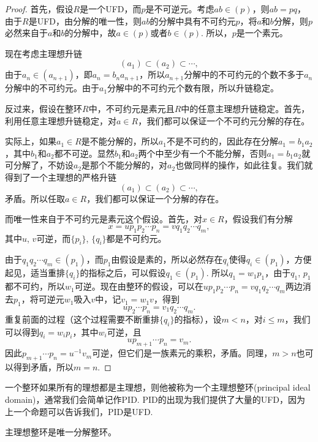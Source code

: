 \begin{proof}
首先，假设$R$是一个UFD，而$p$是不可逆元。考虑$ab\in (p)$，则$ab=pq$，由于$R$是UFD，由分解的唯一性，则$ab$的分解中具有不可约元$p$，将$a$和$b$分解，则$p$必然来自于$a$和$b$的分解中，故$a\in (p)$或者$b\in (p)$. 所以，$p$是一个素元。

现在考虑主理想升链
\[
	(a_1)\subset (a_2)\subset \cdots,
\]
由于$a_n\in (a_{n+1})$，即$a_n=b_na_{n+1}$，所以$a_{n+1}$分解中的不可约元的个数不多于$a_n$分解中的不可约元。由于$a_1$分解中的不可约元个数有限，所以升链稳定。

反过来，假设在整环$R$中，不可约元是素元且$R$中的任意主理想升链稳定。首先，利用任意主理想升链稳定，对$a\in R$，我们都可以保证一个不可约元分解的存在。

实际上，如果$a_1\in R$是不能分解的，所以$a_1$不是不可约的，因此存在分解$a_1=b_1a_2$，其中$b_1$和$a_2$都不可逆。显然$b_1$和$a_2$两个中至少有一个不能分解，否则$a_1=b_1a_2$就可分解了，不妨设$a_2$是那个不能分解的，对$a_2$也做同样的操作，如此往复。我们就得到了一个主理想的严格升链
\[
	(a_1)\subset (a_2)\subset \cdots,
\]
矛盾。所以任取$a\in R$，我们都可以保证一个分解的存在。

而唯一性来自于不可约元是素元这个假设。首先，对$x\in R$，假设我们有分解
\[
	x=up_1p_2\cdots p_n=vq_1q_2\cdots q_m,
\]
其中$u$, $v$可逆，而$\{p_i\}$, $\{q_i\}$都是不可约元。

由于$q_1q_2\cdots q_m\in (p_1)$，而$p_1$由假设是素的，所以必然存在$q_i$使得$q_i \in (p_1)$，方便起见，适当重排$\{q_i\}$的指标之后，可以假设$q_1\in (p_1)$. 所以$q_1=w_1p_1$，由于$q_1$, $p_1$都不可约，所以$w_1$可逆。现在由整环的假设，可以在$up_1p_2\cdots p_n=vq_1q_2\cdots q_m$两边消去$p_1$，将可逆元$w_1$吸入$v$中，记$v_1=w_1v$，得到
\[
	u p_2\cdots p_n= v_1q_2\cdots q_m.
\]
重复前面的过程（这个过程需要不断重排$\{q_i\}$的指标），设$m<n$，对$i\leq m$，我们可以得到$q_i=w_ip_i$，其中$w_i$可逆，且
\[
	u p_{m+1}\cdots p_n= v_m.
\]
因此$p_{m+1}\cdots p_n=u^{-1}v_m$可逆，但它们是一族素元的乘积，矛盾。同理，$m>n$也可以得到矛盾，所以$m=n$.
\end{proof}

一个整环如果所有的理想都是主理想，则他被称为一个主理想整环(principal ideal domain)，通常我们会简单记作PID. PID的出现为我们提供了大量的UFD，因为上一个命题可以告诉我们，PID是UFD.

\begin{pro}
主理想整环是唯一分解整环。
\end{pro}

